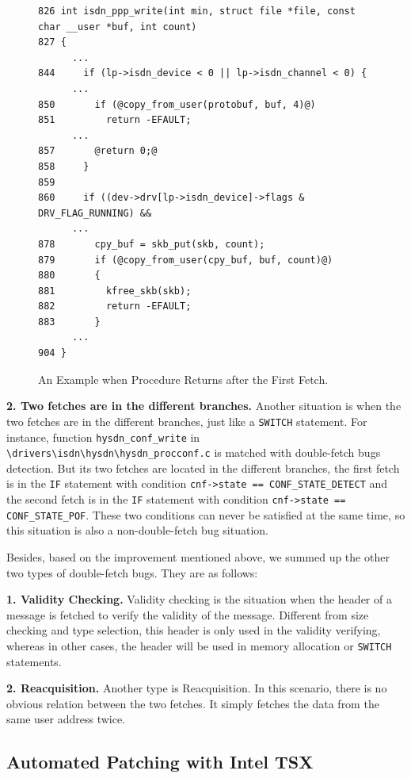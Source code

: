 \documentclass[10pt]{llncs}
\begin{document}
\begin{figure}[t]
  \centering
\begin{lstlisting}[style=code]
826 int isdn_ppp_write(int min, struct file *file, const char __user *buf, int count)
827 {
	  ...
844     if (lp->isdn_device < 0 || lp->isdn_channel < 0) {
	  ...
850       if (@copy_from_user(protobuf, buf, 4)@)
851         return -EFAULT;
	  ...
857       @return 0;@
858     }
859 
860     if ((dev->drv[lp->isdn_device]->flags & DRV_FLAG_RUNNING) &&
	  ...
878       cpy_buf = skb_put(skb, count);
879       if (@copy_from_user(cpy_buf, buf, count)@)
880       {
881         kfree_skb(skb);
882         return -EFAULT;
883       }
	  ...
904 } 
\end{lstlisting}
  \caption{An Example when Procedure Returns after the First Fetch.}
  \label{return}
\end{figure}

\textbf{2. Two fetches are in the different branches.}
Another situation is when the two fetches are in the different branches, just like a \verb:SWITCH: statement. For instance, function \verb:hysdn_conf_write: in \verb:\drivers\isdn\hysdn\hysdn_procconf.c: is matched with double-fetch bugs detection. But its two fetches are located in the different branches, the first fetch is in the \verb:IF: statement with condition \texttt{cnf->state == CONF\_STATE\_DETECT} and the second fetch is in the \verb:IF: statement with condition \texttt{cnf->state == CONF\_STATE\_POF}. These two conditions can never be satisfied at the same time, so this situation is also a non-double-fetch bug situation.

Besides, based on the improvement mentioned above, we summed up the other two types of double-fetch bugs. They are as follows:

\textbf{1. Validity Checking.}
Validity checking is the situation when the header of a message is fetched to verify the validity of the message. Different from size checking and type selection, this header is only used in the validity verifying, whereas in other cases, the header will be used in memory allocation or \verb:SWITCH: statements.

\textbf{2. Reacquisition.}
Another type is Reacquisition. In this scenario, there is no obvious relation between the two fetches. It simply fetches the data from the same user address twice.


\subsection{Automated Patching with Intel TSX}
\label{design2}
\end{document}

